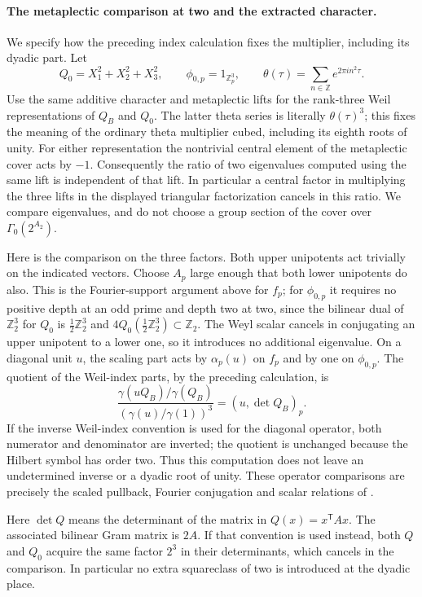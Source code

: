 \paragraph{The metaplectic comparison at two and the extracted character.}
We specify how the preceding index calculation fixes the multiplier,
including its dyadic part. Let
\[
 Q_0=X_1^2+X_2^2+X_3^2,\qquad
 \phi_{0,p}=1_{\mathbb Z_p^3},\qquad
 \theta(\tau)=\sum_{n\in\mathbb Z}e^{2\pi i n^2\tau}.
\]
Use the same additive character and metaplectic lifts for the
rank-three Weil representations of $Q_B$ and $Q_0$. The latter
theta series is literally $\theta(\tau)^3$; this fixes the meaning
of the ordinary theta multiplier cubed, including its eighth roots
of unity. For either representation the nontrivial central element
of the metaplectic cover acts by $-1$. Consequently the ratio of
two eigenvalues computed using the same lift is independent of
that lift. In particular a central factor in multiplying the
three lifts in the displayed triangular factorization cancels
in this ratio. We compare eigenvalues, and do not choose a group
section of the cover over $\Gamma_0(2^{A_2})$.

Here is the comparison on the three factors. Both upper unipotents
act trivially on the indicated vectors. Choose $A_p$ large enough
that both lower unipotents do also. This is the Fourier-support
argument above for $f_p$; for $\phi_{0,p}$ it requires no positive
depth at an odd prime and depth two at two, since the bilinear dual
of $\mathbb Z_2^3$ for $Q_0$ is $\tfrac12\mathbb Z_2^3$ and
$4Q_0(\tfrac12\mathbb Z_2^3)\subset\mathbb Z_2$.
The Weyl scalar cancels in conjugating an upper unipotent to a
lower one, so it introduces no additional eigenvalue. On a
diagonal unit $u$, the scaling part acts by $\alpha_p(u)$ on
$f_p$ and by one on $\phi_{0,p}$. The quotient of the Weil-index
parts, by the preceding calculation, is
\[
 \frac{\gamma(uQ_B)/\gamma(Q_B)}
      {(\gamma(u)/\gamma(1))^3}
       =(u,\det Q_B)_p.                                      \tag{O.5a}
\]
If the inverse Weil-index convention is used for the diagonal
operator, both numerator and denominator are inverted; the
quotient is unchanged because the Hilbert symbol has order two.
Thus this computation does not leave an undetermined inverse
or a dyadic root of unity. These operator comparisons are precisely
the scaled pullback, Fourier conjugation and scalar relations of
\cite[I.13--I.14 and II.25--II.28]{weil}.

Here $\det Q$ means the determinant of the matrix in
$Q(x)=x^{\mathsf T}Ax$. The associated bilinear Gram matrix is
$2A$. If that convention is used instead, both $Q$ and $Q_0$
acquire the same factor $2^3$ in their determinants, which cancels
in the comparison. In particular no extra squareclass of two
is introduced at the dyadic place.

